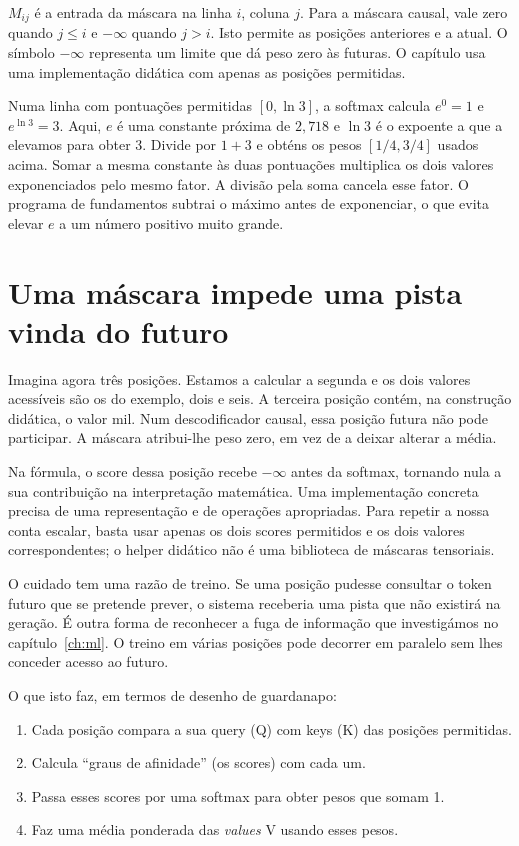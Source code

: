 $M_{ij}$ é a entrada da máscara na linha $i$, coluna $j$. Para a máscara causal, vale zero quando $j\leq i$ e $-\infty$ quando $j>i$. Isto permite as posições anteriores e a atual. O símbolo $-\infty$ representa um limite que dá peso zero às futuras. O capítulo usa uma implementação didática com apenas as posições permitidas.

Numa linha com pontuações permitidas $[0,\ln 3]$, a softmax calcula $e^0=1$ e $e^{\ln 3}=3$. Aqui, $e$ é uma constante próxima de $2{,}718$ e $\ln 3$ é o expoente a que a elevamos para obter 3. Divide por $1+3$ e obténs os pesos $[1/4,3/4]$ usados acima. Somar a mesma constante às duas pontuações multiplica os dois valores exponenciados pelo mesmo fator. A divisão pela soma cancela esse fator. O programa de fundamentos subtrai o máximo antes de exponenciar, o que evita elevar $e$ a um número positivo muito grande.

\section{Uma máscara impede uma pista vinda do futuro}
Imagina agora três posições. Estamos a calcular a segunda e os dois valores acessíveis são os do exemplo, dois e seis. A terceira posição contém, na construção didática, o valor mil. Num descodificador causal, essa posição futura não pode participar. A máscara atribui-lhe peso zero, em vez de a deixar alterar a média.

Na fórmula, o score dessa posição recebe $-\infty$ antes da softmax, tornando nula a sua contribuição na interpretação matemática. Uma implementação concreta precisa de uma representação e de operações apropriadas. Para repetir a nossa conta escalar, basta usar apenas os dois scores permitidos e os dois valores correspondentes; o helper didático não é uma biblioteca de máscaras tensoriais.

O cuidado tem uma razão de treino. Se uma posição pudesse consultar o token futuro que se pretende prever, o sistema receberia uma pista que não existirá na geração. É outra forma de reconhecer a fuga de informação que investigámos no capítulo~\ref{ch:ml}. O treino em várias posições pode decorrer em paralelo sem lhes conceder acesso ao futuro.

O que isto faz, em termos de desenho de guardanapo:

\begin{enumerate}[leftmargin=*]
\item Cada posição compara a sua query (Q) com keys (K) das posições permitidas.
\item Calcula “graus de afinidade” (os scores) com cada um.
\item Passa esses scores por uma softmax para obter pesos que somam 1.
\item Faz uma média ponderada das \emph{values} V usando esses pesos.
\end{enumerate}

